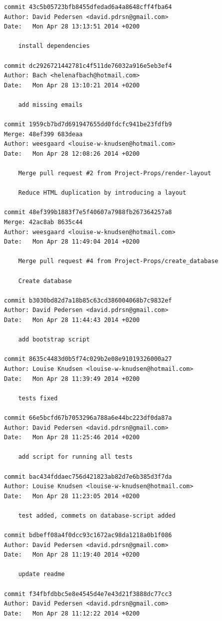 \documentclass[12pt]{article}
\begin{document}
\begin{verbatim}
commit 43c5b05723bfb8455dfedad6a4a8648cff4fba64
Author: David Pedersen <david.pdrsn@gmail.com>
Date:   Mon Apr 28 13:13:51 2014 +0200

    install dependencies

commit dc2926721442781c4f511de76032a916e5eb3ef4
Author: Bach <helenafbach@hotmail.com>
Date:   Mon Apr 28 13:10:21 2014 +0200

    add missing emails

commit 1959cb7bd7d691947655dd0fdcfc941be23fdfb9
Merge: 48ef399 683deaa
Author: weesgaard <louise-w-knudsen@hotmail.com>
Date:   Mon Apr 28 12:08:26 2014 +0200

    Merge pull request #2 from Project-Props/render-layout
    
    Reduce HTML duplication by introducing a layout

commit 48ef399b1883f7e5f40607a7988fb267364257a8
Merge: 42ac8ab 8635c44
Author: weesgaard <louise-w-knudsen@hotmail.com>
Date:   Mon Apr 28 11:49:04 2014 +0200

    Merge pull request #4 from Project-Props/create_database
    
    Create database

commit b3030bd82d7a18b85c63cd386004068b7c9832ef
Author: David Pedersen <david.pdrsn@gmail.com>
Date:   Mon Apr 28 11:44:43 2014 +0200

    add bootstrap script

commit 8635c4483d0b5f74c029b2e08e91019326000a27
Author: Louise Knudsen <louise-w-knudsen@hotmail.com>
Date:   Mon Apr 28 11:39:49 2014 +0200

    tests fixed

commit 66e5bcfd67b7053296a788a6e44bc223df0da87a
Author: David Pedersen <david.pdrsn@gmail.com>
Date:   Mon Apr 28 11:25:46 2014 +0200

    add script for running all tests

commit bac434fddaec756d421823ab82d7e6b385d3f7da
Author: Louise Knudsen <louise-w-knudsen@hotmail.com>
Date:   Mon Apr 28 11:23:05 2014 +0200

    test added, commets on database-script added

commit bdbeff08a4f0dcc93c1672ac98da1218a0b1f086
Author: David Pedersen <david.pdrsn@gmail.com>
Date:   Mon Apr 28 11:19:40 2014 +0200

    update readme

commit f34fbfdbbc5e8e4545d4e7e43d21f3888dc77cc3
Author: David Pedersen <david.pdrsn@gmail.com>
Date:   Mon Apr 28 11:12:22 2014 +0200


\end{verbatim}
\end{document}

